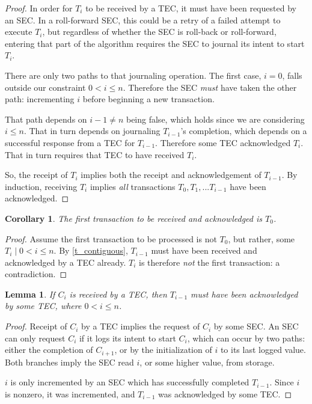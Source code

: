 \documentclass{article}
\newtheorem{lemma}[theorem]{Lemma}
\newtheorem{corollary}{Corollary}[theorem]
\begin{document}
\begin{proof}

In order for $T_i$ to be received by a TEC, it must have been requested by an
SEC. In a roll-forward SEC, this could be a retry of a failed attempt to
execute $T_i$, but regardless of whether the SEC is roll-back or roll-forward,
entering that part of the algorithm requires the SEC to journal its intent to
start $T_i$.

There are only two paths to that journaling operation. The first case, $i = 0$,
falls outside our constraint $0 < i \le n$. Therefore the SEC \textit{must}
have taken the other path: incrementing $i$ before beginning a new transaction.

That path depends on $i - 1 \ne n$ being false, which holds since we are
considering $i \le n$. That in turn depends on journaling $T_{i-1}$'s
completion, which depends on a successful response from a TEC for $T_{i-1}$.
Therefore some TEC acknowledged $T_i$. That in turn requires that TEC to have
received $T_i$.

So, the receipt of $T_i$ implies both the receipt and acknowledgement of
$T_{i-1}$. By induction, receiving $T_i$ implies \textit{all} transactions
$T_0, T_1, ... T_{i-1}$ have been acknowledged.

\end{proof}


\begin{corollary}
\label{t_zero_first}
The first transaction to be received and acknowledged is $T_0$.
\end{corollary}

\begin{proof}

Assume the first transaction to be processed is not $T_0$, but rather, some
$T_i \mid 0 < i \le n$. By \ref{t_contiguous}, $T_{i-1}$ must have been
received and acknowledged by a TEC already. $T_i$ is therefore \textit{not} the
first transaction: a contradiction.

\end{proof}


\begin{lemma}
\label{c_prior_ts}
If $C_i$ is received by a TEC, then $T_{i - 1}$ must have been acknowledged by
some TEC, where $0 < i \le n$.
\end{lemma}

\begin{proof}

Receipt of $C_i$ by a TEC implies the request of $C_i$ by some SEC. An SEC can
only request $C_i$ if it logs its intent to start $C_i$, which can occur by two
paths: either the completion of $C_{i+1}$, or by the initialization of $i$ to
its last logged value. Both branches imply the SEC read $i$, or some higher
value, from storage.

$i$ is only incremented by an SEC which has successfully completed $T_{i-1}$.
Since $i$ is nonzero, it was incremented, and $T_{i-1}$ was acknowledged by
some TEC.

\end{proof}
\end{document}

